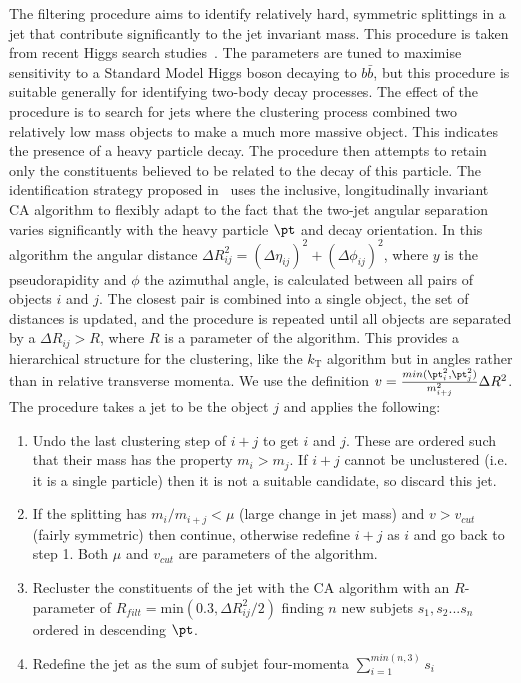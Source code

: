 The filtering procedure aims to identify relatively hard, symmetric splittings in a jet that contribute significantly to the jet invariant mass. This procedure is taken from recent Higgs search studies~\cite{boostedHiggs}. The parameters are tuned to maximise sensitivity to a Standard Model Higgs boson decaying to $b\bar{b}$, but this procedure is suitable generally for identifying two-body decay processes. The effect of the procedure is to search for jets where the clustering process combined two relatively low mass objects to make a much more massive object. This indicates the presence of a heavy particle decay. The procedure then attempts to retain only the constituents believed to be related to the decay of this particle.
The identification strategy proposed in~\cite{boostedHiggs} uses the inclusive, longitudinally invariant CA algorithm to flexibly adapt to the fact that the two-jet angular separation varies significantly with 
the heavy particle $\pt$ and decay orientation. In this algorithm the angular distance 
$\Delta R^2_{ij} = (\Delta \eta_{ij} )^2 + (\Delta \phi_{ij} )^2$, 
where $y$ is the pseudorapidity and $\phi$ the azimuthal angle, is calculated between all 
pairs of objects $i$ and $j$. The closest pair is combined into a single object, the set of distances is 
updated, and the procedure is repeated until all objects are separated by a $\Delta R_{ij} > R$, where $R$ 
is a parameter of the algorithm. This provides a hierarchical structure for the clustering, like the 
$k_{\mathrm{T}}$ algorithm but in angles rather than in relative transverse momenta.
We use the definition $v = \frac{min({\pt}_i^2,{\pt}_j^2) }{m^2_{i+j}} \Delta R^2$. The procedure takes a
jet to be the object $j$ and applies the following:
\begin{enumerate}
\item Undo the last clustering step of $i+j$ to get $i$ and $j$. These are ordered such that their mass has the property $m_{i} > m_{j}$. If $i+j$ cannot be unclustered (i.e. it is a single particle) then it is not a suitable candidate, so discard this jet.
\item  If the splitting has $m_{i}/m_{i+j} < \mu$ (large change in jet mass) and $v > v_{cut}$ (fairly symmetric) then continue, otherwise redefine $i+j$ as $i$ and go back to step 1. Both $\mu$ and $v_{cut}$ are parameters of the algorithm.
\item  Recluster the constituents of the jet with the CA algorithm with an $R$-parameter of $R_{filt} =\mbox{min} (0.3, \Delta R^2_{ij} /2)$ finding $n$ new subjets $s_1, s_2 ...s_n$ ordered in descending $\pt$.
\item  Redefine the jet as the sum of subjet four-momenta $\sum_{i=1}^{min(n,3)} s_i$
\end{enumerate}

